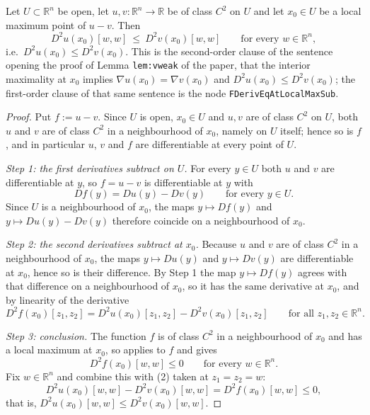 \begin{lemma}
Let $U\subset\mathbb{R}^n$ be open, let $u,v:\mathbb{R}^n\to\mathbb{R}$ be of class $C^2$ on $U$
and let $x_0\in U$ be a local maximum point of $u-v$. Then
$$D^2u(x_0)[w,w]\ \leq\ D^2v(x_0)[w,w]\qquad\text{for every }w\in\mathbb{R}^n,$$
i.e.\ $D^2u(x_0)\leq D^2v(x_0)$. This is the second-order clause of the sentence opening the proof
of Lemma \texttt{lem:vweak} of the paper, that the interior maximality at $x_0$ implies
$\nabla u(x_0)=\nabla v(x_0)$ and $D^2u(x_0)\leq D^2v(x_0)$; the first-order clause of that same
sentence is the node \texttt{FDerivEqAtLocalMaxSub}.
\end{lemma}
\begin{proof}
Put $f:=u-v$. Since $U$ is open, $x_0\in U$ and $u,v$ are of class $C^2$ on $U$, both $u$ and $v$
are of class $C^2$ in a neighbourhood of $x_0$, namely on $U$ itself; hence so is $f$, and in
particular $u$, $v$ and $f$ are differentiable at every point of $U$.

\emph{Step 1: the first derivatives subtract on $U$.} For every $y\in U$ both $u$ and $v$ are
differentiable at $y$, so $f=u-v$ is differentiable at $y$ with
\begin{equation*}Df(y)=Du(y)-Dv(y)\qquad\text{for every }y\in U. \tag{1}\end{equation*}
Since $U$ is a neighbourhood of $x_0$, the maps $y\mapsto Df(y)$ and $y\mapsto Du(y)-Dv(y)$
therefore coincide on a neighbourhood of $x_0$.

\emph{Step 2: the second derivatives subtract at $x_0$.} Because $u$ and $v$ are of class $C^2$ in
a neighbourhood of $x_0$, the maps $y\mapsto Du(y)$ and $y\mapsto Dv(y)$ are differentiable at
$x_0$, hence so is their difference. By Step 1 the map $y\mapsto Df(y)$ agrees with that difference
on a neighbourhood of $x_0$, so it has the same derivative at $x_0$, and by linearity of the
derivative
\begin{equation*}D^2f(x_0)[z_1,z_2]=D^2u(x_0)[z_1,z_2]-D^2v(x_0)[z_1,z_2]\qquad
\text{for all }z_1,z_2\in\mathbb{R}^n. \tag{2}\end{equation*}

\emph{Step 3: conclusion.} The function $f$ is of class $C^2$ in a neighbourhood of $x_0$ and has a
local maximum at $x_0$, so  applies to $f$ and gives
$$D^2f(x_0)[w,w]\leq0\qquad\text{for every }w\in\mathbb{R}^n .$$
Fix $w\in\mathbb{R}^n$ and combine this with (2) taken at $z_1=z_2=w$:
$$D^2u(x_0)[w,w]-D^2v(x_0)[w,w]=D^2f(x_0)[w,w]\leq0,$$
that is, $D^2u(x_0)[w,w]\leq D^2v(x_0)[w,w]$.
\end{proof}
